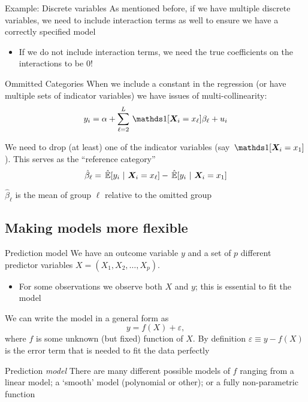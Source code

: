 \documentclass[aspectratio=169,t,11pt,table]{beamer}
\begin{document}
\begin{frame}{Example: Discrete variables}
  As mentioned before, if we have multiple discrete variables, we need to include interaction terms as well to ensure we have a correctly specified model
  \begin{itemize}
    \item If we do not include interaction terms, we need the true coefficients on the interactions to be 0!
  \end{itemize}
\end{frame}

\begin{frame}{Ommitted Categories}
  When we include a constant in the regression (or have multiple sets of indicator variables) we have issues of \alert{multi-collinearity}:
  $$
    y_i = \alpha + \sum_{\ell = 2}^L \one{\bm{X}_i = x_\ell} \beta_\ell + u_i
  $$

  \bigskip
  We need to drop (at least) one of the indicator variables (say $\one{\bm{X}_i = x_1}$). This serves as the ``reference category''
  $$
    \hat{\beta}_{\ell} = \expechat{y_i}{\bm{X}_i = x_\ell} - \expechat{y_i}{\bm{X}_i = x_1}
  $$
  
  $\hat{\beta}_{\ell}$ is the mean of group $\ell$ relative to the omitted group
\end{frame}

\subsection{Making models more flexible}

\begin{frame}{Prediction model}
  We have an outcome variable $y$ and a set of $p$ different predictor variables $X = (X_1, X_2, \dots, X_p)$. 
  \begin{itemize}
    \item For some observations we observe both $X$ and $y$; this is essential to \alert{fit} the model
  \end{itemize}

  \bigskip
  We can write the model in a general form as
  $$
    y = f(X) + \varepsilon,
  $$
  where $f$ is some unknown (but fixed) function of $X$. By definition $\varepsilon \equiv y - f(X)$ is the \alert{error term} that is needed to fit the data perfectly
\end{frame}

\begin{frame}{Prediction \emph{model}}
  There are many different possible models of $f$ ranging from a linear model; a `smooth' model (polynomial or other); or a fully non-parametric function
\end{frame}
\end{document}
